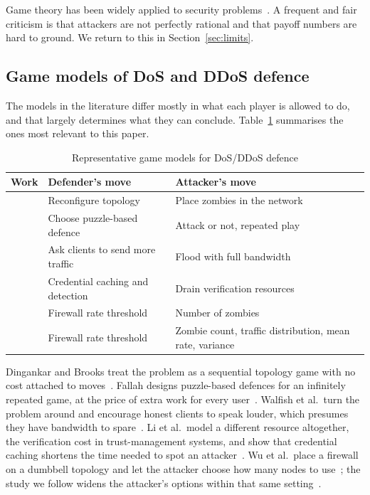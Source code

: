 \documentclass[conference]{IEEEtran}
\begin{document}
Game theory has been widely applied to security problems~\cite{manshaei2013}. A frequent and fair criticism is that attackers are not perfectly rational and that payoff numbers are hard to ground. We return to this in Section~\ref{sec:limits}.

\subsection{Game models of DoS and DDoS defence}
The models in the literature differ mostly in what each player is allowed to do, and that largely determines what they can conclude. Table~\ref{tab:related} summarises the ones most relevant to this paper.

\begin{table}[t]
\caption{Representative game models for DoS/DDoS defence}
\label{tab:related}
\centering\scriptsize
\begin{tabular}{p{0.9cm}p{2.6cm}p{3.2cm}}
\toprule
Work & Defender's move & Attacker's move\\
\midrule
\cite{dingankar2007} & Reconfigure topology & Place zombies in the network\\
\cite{fallah2010} & Choose puzzle-based defence & Attack or not, repeated play\\
\cite{walfish2006} & Ask clients to send more traffic & Flood with full bandwidth\\
\cite{li2009} & Credential caching and detection & Drain verification resources\\
\cite{wu2010} & Firewall rate threshold & Number of zombies\\
\cite{spyridopoulos2013} & Firewall rate threshold & Zombie count, traffic distribution, mean rate, variance\\
\bottomrule
\end{tabular}
\end{table}

Dingankar and Brooks treat the problem as a sequential topology game with no cost attached to moves~\cite{dingankar2007}. Fallah designs puzzle-based defences for an infinitely repeated game, at the price of extra work for every user~\cite{fallah2010}. Walfish et al.\ turn the problem around and encourage honest clients to speak louder, which presumes they have bandwidth to spare~\cite{walfish2006}. Li et al.\ model a different resource altogether, the verification cost in trust-management systems, and show that credential caching shortens the time needed to spot an attacker~\cite{li2009}. Wu et al.\ place a firewall on a dumbbell topology and let the attacker choose how many nodes to use~\cite{wu2010}; the study we follow widens the attacker's options within that same setting~\cite{spyridopoulos2013}.
\end{document}
